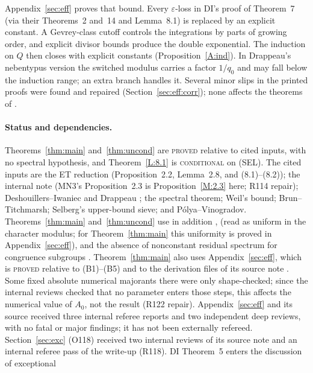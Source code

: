 \documentclass[10pt,reqno]{amsart}
\theoremstyle{definition}
\numberwithin{equation}{section}
\newcommand{\status}[1]{\textup{\textsc{#1}}}
\begin{document}
Appendix~\ref{sec:eff} proves that bound. Every $\varepsilon$-loss in DI's
proof of Theorem~7 (via their Theorems~2 and~14 and Lemma~8.1) is replaced
by an explicit constant. A Gevrey-class cutoff controls the integrations
by parts of growing order, and explicit divisor bounds produce the double
exponential. The induction on $Q$ \cite[(8.19)]{DI} then closes with
explicit constants (Proposition~\ref{A:ind}). In Drappeau's nebentypus
version the switched modulus carries a factor $1/q_0$ and may fall below
the induction range; an extra branch handles it. Several minor slips in
the printed proofs were found and repaired (Section~\ref{sec:eff:corr}); none
affects the theorems of \cite{DI,Dr}.

\paragraph{Status and dependencies.}
Theorems~\ref{thm:main} and~\ref{thm:uncond} are \status{proved} relative to
cited inputs, with no spectral hypothesis, and Theorem~\ref{L:8.1} is
\status{conditional} on (SEL). The cited inputs are the ET reduction (Proposition~2.2, Lemma~2.8,
and (8.1)--(8.2)); the internal note \cite[Proposition~2.3 and
proof of Theorem~3.8, step~(1)]{MN3} (MN3's Proposition~2.3 is
Proposition~\ref{M:2.3} here; R114 repair); Deshouillers--Iwaniec \cite[Theorem~2]{DI} and
Drappeau \cite[Proposition~4.7, arXiv numbering]{Dr}; the spectral theorem;
Weil's bound; Brun--Titchmarsh; Selberg's upper-bound sieve; and
P\'olya--Vinogradov. Theorems~\ref{thm:main} and~\ref{thm:uncond} use in
addition \cite[Theorem~7]{DI}, \cite[Lemma~4.10]{Dr} (read as uniform in the
character modulus; for Theorem~\ref{thm:main} this uniformity is proved in
Appendix~\ref{sec:eff}), and the
absence of nonconstant residual spectrum for congruence subgroups
\cite{Iw,Hux}. Theorem~\ref{thm:main} also uses Appendix~\ref{sec:eff}, which is
\status{proved} relative to (B1)--(B5) and to the derivation files of its
source note \cite{TTL3}. Some fixed absolute numerical majorants there were
only shape-checked; since the internal reviews checked that no parameter
enters those steps, this affects the numerical value of $A_0$, not the
result (R122 repair). Appendix~\ref{sec:eff} and its source received
three internal referee reports and two independent deep reviews, with no
fatal or major findings; it has not been externally refereed.
Section~\ref{sec:exc} (O118) received two internal reviews of its
source note and an internal referee pass of the write-up (R118). DI Theorem~5 enters the discussion of exceptional
\end{document}
